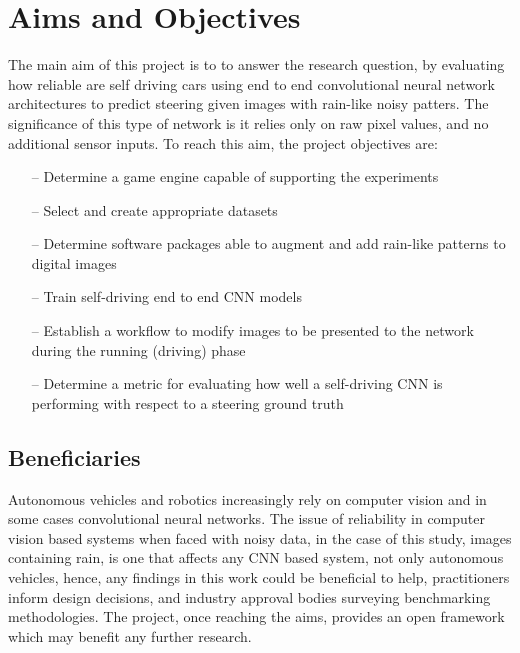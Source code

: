 \section{Aims and Objectives}
\label{intro:aims-and-objectives}

The main aim of this project is to to answer the research question, by evaluating how reliable are self driving cars using end to end convolutional neural network architectures to predict steering given images with rain-like noisy patters. The significance of this type of network is it relies only on raw pixel values, and no additional sensor inputs. 
To reach this aim, the project objectives are:
\begin{itemize}
    \item[--] Determine a game engine capable of supporting the experiments 
    \item[--] Select and create appropriate datasets 
    \item[--] Determine software packages able to augment and add rain-like patterns to digital images
    \item[--] Train self-driving end to end CNN models    
    \item[--] Establish a workflow to modify images to be presented to the network during the running (driving) phase
    \item[--] Determine a metric for evaluating how well a self-driving CNN is performing with respect to a steering ground truth    
\end{itemize}

\subsection{Beneficiaries}


Autonomous vehicles and robotics increasingly rely on computer vision and in some cases convolutional neural networks. The issue of reliability in computer vision based systems when faced with noisy data, in the case of this study, images containing rain, is one that affects any CNN based system, not only autonomous vehicles, hence, any findings in this work could be beneficial to help, practitioners inform design decisions, and industry approval bodies surveying benchmarking methodologies. The project, once reaching the aims, provides an open framework which may benefit any further research.

